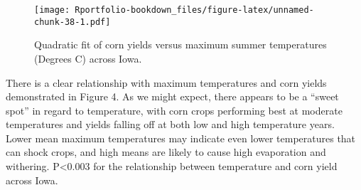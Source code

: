 \documentclass[
]{book}
\newenvironment{Shaded}{\begin{snugshade}}{\end{snugshade}}
\newcommand{\AttributeTok}[1]{\textcolor[rgb]{0.77,0.63,0.00}{#1}}
\newcommand{\FunctionTok}[1]{\textcolor[rgb]{0.00,0.00,0.00}{#1}}
\newcommand{\NormalTok}[1]{#1}
\newcommand{\OtherTok}[1]{\textcolor[rgb]{0.56,0.35,0.01}{#1}}
\newcommand{\SpecialCharTok}[1]{\textcolor[rgb]{0.00,0.00,0.00}{#1}}
\newcommand{\StringTok}[1]{\textcolor[rgb]{0.31,0.60,0.02}{#1}}
\begin{document}
\begin{Shaded}
\end{Shaded}

\begin{figure}
\centering
\texttt{[image: Rportfolio-bookdown\_files/figure-latex/unnamed-chunk-38-1.pdf]}
\caption{\label{fig:unnamed-chunk-38}Quadratic fit of corn yields versus maximum summer temperatures (Degrees C) across Iowa.}
\end{figure}

There is a clear relationship with maximum temperatures and corn yields demonstrated in Figure 4. As we might expect, there appears to be a ``sweet spot'' in regard to temperature, with corn crops performing best at moderate temperatures and yields falling off at both low and high temperature years. Lower mean maximum temperatures may indicate even lower temperatures that can shock crops, and high means are likely to cause high evaporation and withering. P\textless0.003 for the relationship between temperature and corn yield across Iowa.
\end{document}
